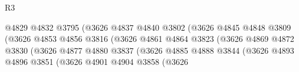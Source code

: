 \begin{lexlean}{R3}
\begin{coremodule}
                                                  @4829
                                                  @4832
                                                  @3795
                                                  (@3626
                                                    @4837
                                                    @4840
                                                    @3802
                                                    (@3626
                                                      @4845
                                                      @4848
                                                      @3809
                                                      (@3626
                                                        @4853
                                                        @4856
                                                        @3816
                                                        (@3626
                                                          @4861
                                                          @4864
                                                          @3823
                                                          (@3626
                                                            @4869
                                                            @4872
                                                            @3830
                                                            (@3626
                                                              @4877
                                                              @4880
                                                              @3837
                                                              (@3626
                                                                @4885
                                                                @4888
                                                                @3844
                                                                (@3626
                                                                  @4893
                                                                  @4896
                                                                  @3851
                                                                  (@3626
                                                                    @4901
                                                                    @4904
                                                                    @3858
                                                                    (@3626

\end{coremodule}
\end{lexlean}
